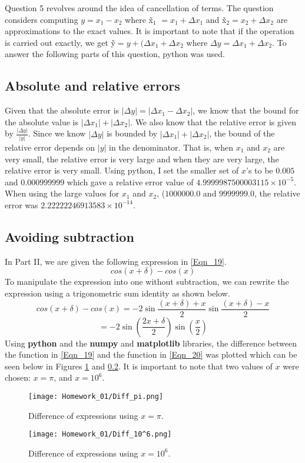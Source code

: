 \documentclass{article}
\begin{document}
Question 5 revolves around the idea of cancellation of terms. The question considers computing \(y = x_1 - x_2\) where \~{x}$_1$ \(= x_1 + \Delta x_1\) and \~{x}$_2$\( = x_2 + \Delta x_2\) are approximations to the exact values. It is important to note that if the operation is carried out exactly, we get \~{y}\( = y + (\Delta x_1 + \Delta x_2\) where \(\Delta y = \Delta x_1 + \Delta x_2\). To answer the following parts of this question, python was used.
\subsection{Absolute and relative errors}
Given that the absolute error is \(|\Delta y| = |\Delta x_1 - \Delta x_2|\), we know that the bound for the absolute value is \(|\Delta x_1| + |\Delta x_2|\). We also know that the relative error is given by \(\frac{|\Delta y|}{|y|}\). Since we know \(|\Delta y|\) is bounded by \(|\Delta x_1| + |\Delta x_2|\), the bound of the relative error depends on \(|y|\) in the denominator. That is, when \(x_1\) and \(x_2\) are very small, the relative error is very large and when they are very large, the relative error is very small. Using python, I set the smaller set of \(x\)'s to be \(0.005\) and \(0.000999999\) which gave a relative error value of \(4.9999987500003115\times10^{-5}\). When using the large values for \(x_1\) and \(x_2\), (\(1000000.0\) and \(9999999.0\), the relative error was \(2.22222246913583\times10^{-14}\).

\subsection{Avoiding subtraction}
In Part II, we are given the following expression in \ref{Eqn_19}.
\begin{equation}
    \label{Eqn_19}
    cos(x + \delta) - cos(x)
\end{equation}
To manipulate the expression into one without subtraction, we can rewrite the expression using a trigonometric sum identity as shown below.
\begin{equation}
    \label{Eqn_20}
    cos(x + \delta) - cos(x) = -2\sin{\frac{(x + \delta) + x}{2}\sin{\frac{(x + \delta) - x}{2}}}
\end{equation}
\[
= -2\sin{(\frac{2x + \delta}{2})\sin{(\frac{x}{2})}}
\]
Using \textbf{python} and the \textbf{numpy} and \textbf{matplotlib} libraries, the difference between the function in \ref{Eqn_19} and the function in \ref{Eqn_20} was plotted which can be seen below in Figures \ref{fig:Diff_pi} and \ref{}. It is important to note that two values of \(x\) were chosen: \(x=\pi\), and \(x=10^6\).
\begin{figure}[h!]
    \centering
    \texttt{[image: Homework\_01/Diff\_pi.png]}
    \caption{Difference of expressions using \(x=\pi\).}
    \label{fig:Diff_pi}
\end{figure}
\begin{figure}[h!]
    \centering
    \texttt{[image: Homework\_01/Diff\_10^6.png]}
    \caption{Difference of expressions using \(x=10^6\).}
    \label{fig:enter-label}
\end{figure}
\end{document}
